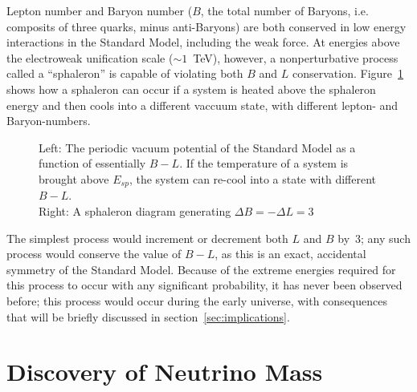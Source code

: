 \documentclass[/main.tex]{subfiles}
\begin{document}
Lepton number and Baryon number ($B$, the total number of Baryons, i.e. composits of three quarks, minus anti-Baryons) are both conserved in low energy interactions in the Standard Model, including the weak force.
At energies above the electroweak unification scale ($\sim1$~TeV), however, a nonperturbative process called a ``sphaleron'' is capable of violating both $B$ and $L$ conservation.
Figure~\ref{fig:sphaleron} shows how a sphaleron can occur if a system is heated above the sphaleron energy and then cools into a different vaccuum state, with different lepton- and Baryon-numbers.
\begin{figure}[t]
  \centering
  \caption[Standard Model Sphaleron]{\label{fig:sphaleron}
    Left: The periodic vacuum potential of the Standard Model as a function of essentially $B-L$. If the temperature of a system is brought above $E_{sp}$, the system can re-cool into a state with different $B-L$.\\
    Right: A sphaleron diagram generating $\Delta B = -\Delta L = 3$
  }
\end{figure}
The simplest process would increment or decrement both $L$ and $B$ by~3; any such process would conserve the value of $B-L$, as this is an exact, accidental symmetry of the Standard Model.
Because of the extreme energies required for this process to occur with any significant probability, it has never been observed before; this process would occur during the early universe, with consequences that will be briefly discussed in section~\ref{sec:implications}.

\section{Discovery of Neutrino Mass}
\end{document}
